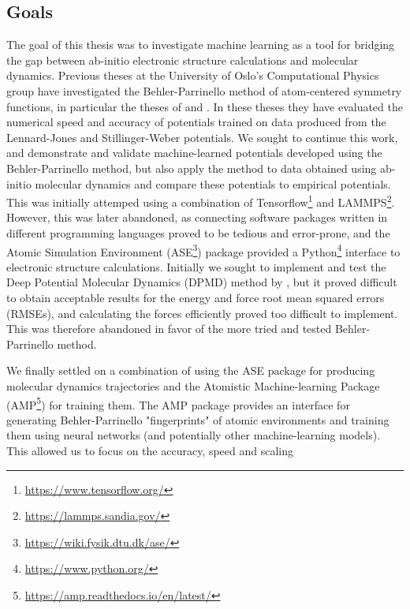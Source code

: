 \subsection{Goals}
The goal of this thesis was to investigate machine learning
as a tool for bridging the gap between ab-initio electronic structure
calculations and molecular dynamics. Previous theses at the University
of Oslo's Computational Physics group have investigated the Behler-Parrinello
\cite{behler2007generalized} method of atom-centered symmetry functions,
in particular the theses of
\parencite[Stende, John A,]{stende2017constructing} and
\parencite[Treider, H{\aa}kon Vik{\o}r]{treider2017speeding}.
In these theses they have evaluated the
numerical speed and accuracy of potentials trained on data
produced from the Lennard-Jones
and Stillinger-Weber potentials.
We sought to continue this work, and demonstrate and validate machine-learned
potentials developed using the Behler-Parrinello method, but also apply
the method to data obtained using ab-initio molecular dynamics
and compare these potentials to empirical potentials.
This was initially attemped using a combination of Tensorflow\footnote{
    \url{https://www.tensorflow.org/}} and LAMMPS\footnote{
    \url{https://lammps.sandia.gov/}}.
However, this was later abandoned, as connecting software packages written
in different programming languages proved to be tedious and error-prone,
and the Atomic Simulation Environment (ASE\footnote{
    \url{https://wiki.fysik.dtu.dk/ase/}}) package provided a Python\footnote{
    \url{https://www.python.org/}} 
interface to electronic structure calculations.
Initially we sought to implement and test the Deep Potential Molecular Dynamics
(DPMD) method by \parencite[Zhang et al.]{PhysRevLett.120.143001}, but
it proved difficult to obtain acceptable results for the energy
and force root mean squared errors (RMSEs), and calculating the forces
efficiently proved too difficult to implement. This was therefore abandoned
in favor of the more tried and tested Behler-Parrinello method.
\par
We finally settled on a combination of using the ASE package for producing
molecular dynamics trajectories and the Atomistic Machine-learning Package
(AMP\footnote{\url{https://amp.readthedocs.io/en/latest/}}) 
for training them. 
The AMP package provides an interface
for generating Behler-Parrinello "fingerprints" of atomic environments
and training them using neural networks (and potentially other machine-learning
models). This allowed us to focus on the accuracy, speed and scaling
